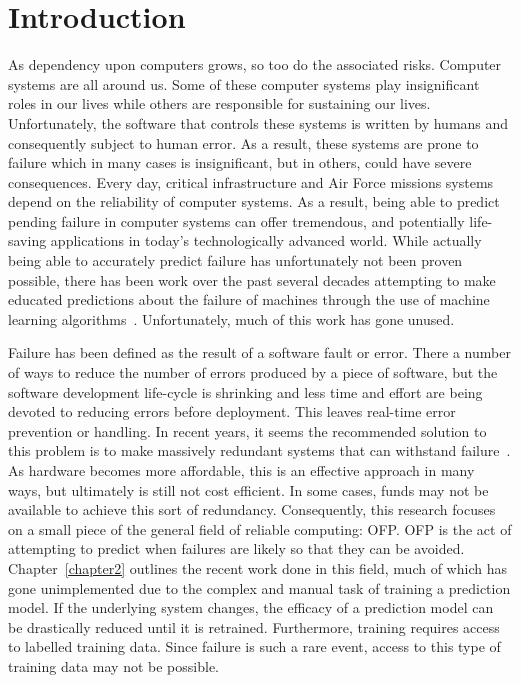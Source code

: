 \chapter{Introduction} \label{chapter1}
As dependency upon computers grows, so too do the associated risks.  Computer
systems are all around us.  Some of these computer systems play insignificant
roles in our lives while others are responsible for sustaining our lives.
Unfortunately, the software that controls these systems is written by humans
and consequently subject to human error.  As a result, these systems are prone
to failure which in many cases is insignificant, but in others, could have
severe consequences.  Every day, critical infrastructure and Air Force missions
systems depend on the reliability of computer systems.  As a result, being able
to predict pending failure in computer systems can offer tremendous, and
potentially life-saving applications in today's technologically advanced world.
While actually being able to accurately predict failure has unfortunately not
been proven possible, there has been work over the past several decades
attempting to make educated predictions about the failure of machines through
the use of machine learning algorithms~\cite{salfnerSurvey}.  Unfortunately,
much of this work has gone unused.  

Failure has been defined as the result of a software fault or error.  There a
number of ways to reduce the number of errors produced by a piece of software,
but the software development life-cycle is shrinking and less time and effort
are being devoted to reducing errors before deployment.  This leaves real-time
error prevention or handling.  In recent years, it seems the recommended
solution to this problem is to make massively redundant systems that can
withstand failure~\cite{bauer2012}.  As hardware becomes more affordable, this
is an effective approach in many ways, but ultimately is still not cost
efficient.  In some cases, funds may not be available to achieve this sort of
redundancy.  Consequently, this research focuses on a small piece of the
general field of reliable computing: \ac{OFP}.  \ac{OFP} is the act of
attempting to predict when failures are likely so that they can be avoided.
Chapter~\ref{chapter2} outlines the recent work done in this field, much of
which has gone unimplemented due to the complex and manual task of training a
prediction model.  If the underlying system changes, the efficacy of a
prediction model can be drastically reduced until it is retrained.
Furthermore, training requires access to labelled training data.  Since failure
is such a rare event, access to this type of training data may not be possible.  

